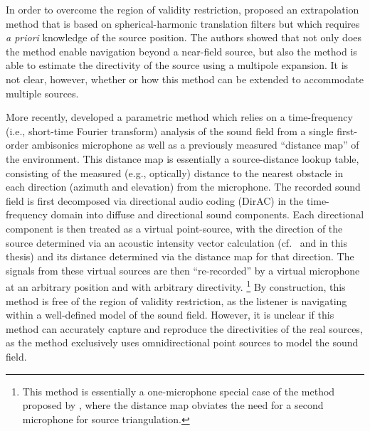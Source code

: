 In order to overcome the region of validity restriction, \citet{Wakayama2017} proposed an extrapolation method that is based on spherical-harmonic translation filters but which requires \textit{a priori} knowledge of the source position.
The authors showed that not only does the method enable navigation beyond a near-field source, but also the method is able to estimate the directivity of the source using a multipole expansion.
It is not clear, however, whether or how this method can be extended to accommodate multiple sources.

More recently, \citet{Plinge2018} developed a parametric method which relies on a time-frequency (i.e., short-time Fourier transform) analysis of the sound field from a single first-order ambisonics microphone as well as a previously measured ``distance map'' of the environment.
This distance map is essentially a source-distance lookup table, consisting of the measured (e.g., optically) distance to the nearest obstacle in each direction (azimuth and elevation) from the microphone.
The recorded sound field is first decomposed via directional audio coding (DirAC) \citep{Pulkki2007} in the time-frequency domain into diffuse and directional sound components.
Each directional component is then treated as a virtual point-source, with the direction of the source determined via an acoustic intensity vector calculation (cf.~\citet[Eq.~(11)]{MerimaaPulkki2005} and  in this thesis) and its distance determined via the distance map for that direction.
The signals from these virtual sources are then ``re-recorded'' by a virtual microphone at an arbitrary position and with arbitrary directivity.%
\footnote{This method is essentially a one-microphone special case of the method proposed by \citet{Thiergart2013}, where the distance map obviates the need for a second microphone for source triangulation.}
By construction, this method is free of the region of validity restriction, as the listener is navigating within a well-defined model of the sound field.
However, it is unclear if this method can accurately capture and reproduce the directivities of the real sources, as the method exclusively uses omnidirectional point sources to model the sound field.


